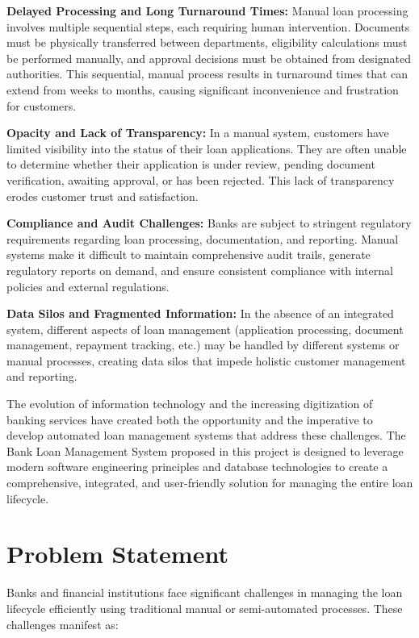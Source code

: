 \documentclass[12pt,a4paper,oneside]{report}
\begin{document}
\textbf{Delayed Processing and Long Turnaround Times:} Manual loan processing involves multiple sequential steps, each requiring human intervention. Documents must be physically transferred between departments, eligibility calculations must be performed manually, and approval decisions must be obtained from designated authorities. This sequential, manual process results in turnaround times that can extend from weeks to months, causing significant inconvenience and frustration for customers.

\textbf{Opacity and Lack of Transparency:} In a manual system, customers have limited visibility into the status of their loan applications. They are often unable to determine whether their application is under review, pending document verification, awaiting approval, or has been rejected. This lack of transparency erodes customer trust and satisfaction.

\textbf{Compliance and Audit Challenges:} Banks are subject to stringent regulatory requirements regarding loan processing, documentation, and reporting. Manual systems make it difficult to maintain comprehensive audit trails, generate regulatory reports on demand, and ensure consistent compliance with internal policies and external regulations.

\textbf{Data Silos and Fragmented Information:} In the absence of an integrated system, different aspects of loan management (application processing, document management, repayment tracking, etc.) may be handled by different systems or manual processes, creating data silos that impede holistic customer management and reporting.

The evolution of information technology and the increasing digitization of banking services have created both the opportunity and the imperative to develop automated loan management systems that address these challenges. The Bank Loan Management System proposed in this project is designed to leverage modern software engineering principles and database technologies to create a comprehensive, integrated, and user-friendly solution for managing the entire loan lifecycle.

\section{Problem Statement}

Banks and financial institutions face significant challenges in managing the loan lifecycle efficiently using traditional manual or semi-automated processes. These challenges manifest as:
\end{document}

